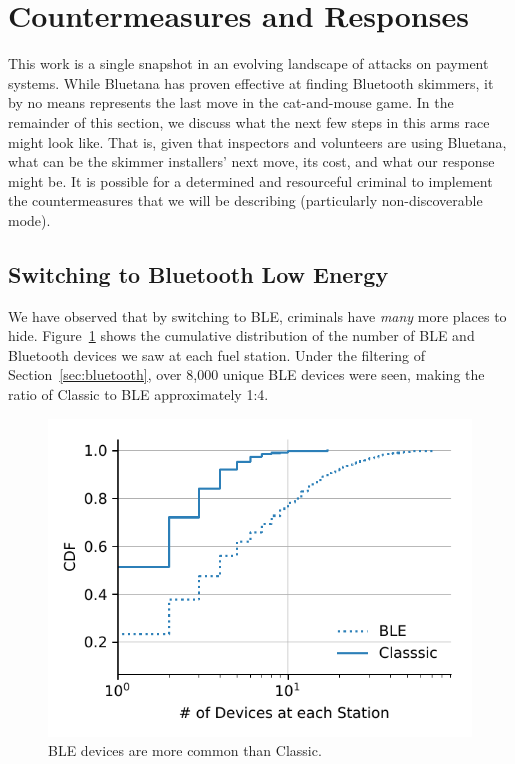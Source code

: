 \section{Countermeasures and Responses}
\label{sec:hiding}
This work is a single snapshot in an evolving landscape of attacks on payment systems. While Bluetana has
proven effective at finding Bluetooth skimmers, it by no means represents the last move in the cat-and-mouse game. In
the remainder of this section, we discuss what the next few steps in this arms race might look like. That is, given
that inspectors and volunteers are using Bluetana, what can be the skimmer installers' next move, its cost, and what our
response might be. It is possible for a determined and resourceful criminal to implement the countermeasures that we will be describing (particularly non-discoverable mode).


\subsection{Switching to Bluetooth Low Energy}
\label{sec:hiding:ble}

We have observed that by switching to BLE, criminals have \emph{many} more places to hide.
%
Figure~\ref{fig:classic-v-ble} shows the cumulative distribution of the number of BLE and Bluetooth devices we saw at each
fuel station.
%
Under the filtering of Section~\ref{sec:bluetooth}, over 8,000 unique BLE devices were seen, making
the ratio of Classic to BLE approximately 1:4.

\begin{figure}
    \centering
    \captionsetup{justification=centering}
    \includegraphics[width=0.6\linewidth]{skimmer/plots/cdf_num_devices_seen.pdf}
    \caption{BLE devices are more common than Classic.}
    \label{fig:classic-v-ble}
    \vspace{-1em}
\end{figure}

